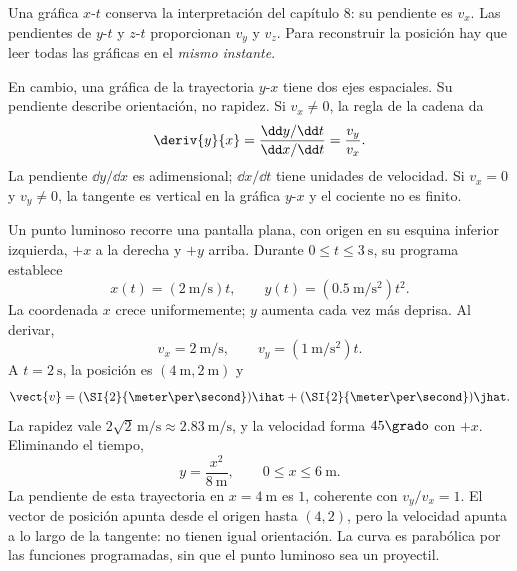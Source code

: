 Una gráfica \(x\)-\(t\) conserva la interpretación del capítulo 8: su
pendiente es \(v_x\). Las pendientes de \(y\)-\(t\) y \(z\)-\(t\)
proporcionan \(v_y\) y \(v_z\). Para reconstruir la posición hay que leer
todas las gráficas en el \emph{mismo instante}.

En cambio, una gráfica de la trayectoria \(y\)-\(x\) tiene dos ejes
espaciales. Su pendiente describe orientación, no rapidez. Si \(v_x\ne0\),
la regla de la cadena da
\[ \deriv{y}{x}=\frac{\dd y/\dd t}{\dd x/\dd t}=\frac{v_y}{v_x}. \]
La pendiente \(\dd y/\dd x\) es adimensional; \(\dd x/\dd t\) tiene
unidades de velocidad. Si \(v_x=0\) y \(v_y\ne0\), la tangente es
vertical en la gráfica \(y\)-\(x\) y el cociente no es finito.

\begin{ejemplo}
Un punto luminoso recorre una pantalla plana, con origen en su esquina
inferior izquierda, \(+x\) a la derecha y \(+y\) arriba. Durante
\(0\leq t\leq\SI{3}{\second}\), su programa establece
\[ x(t)=(\SI{2}{\meter\per\second})t,\qquad
y(t)=(\SI{0.5}{\meter\per\second\squared})t^2. \]
La coordenada \(x\) crece uniformemente; \(y\) aumenta cada vez más deprisa.
Al derivar,
\[ v_x=\SI{2}{\meter\per\second},\qquad
v_y=(\SI{1}{\meter\per\second\squared})t. \]
A \(t=\SI{2}{\second}\), la posición es
\((\SI{4}{\meter},\SI{2}{\meter})\) y
\[ \vect{v}=(\SI{2}{\meter\per\second})\ihat
+(\SI{2}{\meter\per\second})\jhat. \]
La rapidez vale \(2\sqrt{2}\,\si{\meter\per\second}\approx
\SI{2.83}{\meter\per\second}\), y la velocidad forma \(45\grado\)
con \(+x\). Eliminando el tiempo,
\[ y=\frac{x^2}{\SI{8}{\meter}},\qquad 0\leq x\leq\SI{6}{\meter}. \]
La pendiente de esta trayectoria en \(x=\SI{4}{\meter}\) es \(1\),
coherente con \(v_y/v_x=1\). El vector de posición apunta desde el origen
hasta \((4,2)\), pero la velocidad apunta a lo largo de la tangente:
no tienen igual orientación. La curva es parabólica por las funciones
programadas, sin que el punto luminoso sea un proyectil.
\end{ejemplo}


